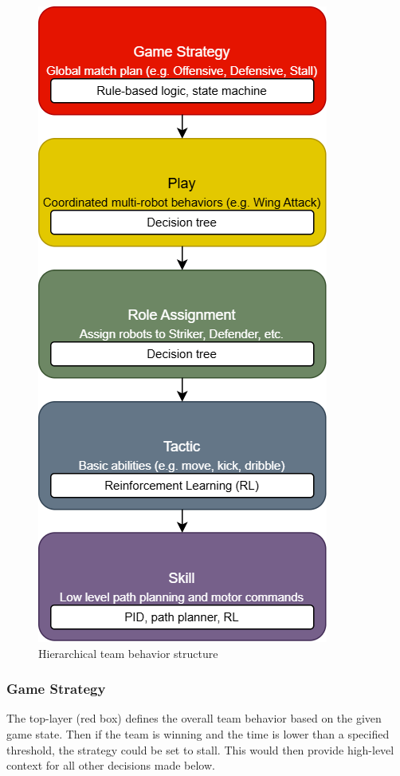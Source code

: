 \begin{figure}[h]
    \centering
    \includegraphics[width=0.8\linewidth]{./StrategyHierarchy.png}
    \caption{Hierarchical team behavior structure}
    \label{fig:strategy_hierarchy}
\end{figure}

\subsubsection{Game Strategy}
The top-layer (red box) defines the overall team behavior based on the given game state.
Then if the team is winning and the time is lower than a specified threshold, the strategy could be set to stall. This would then provide high-level context for all other decisions made below.

